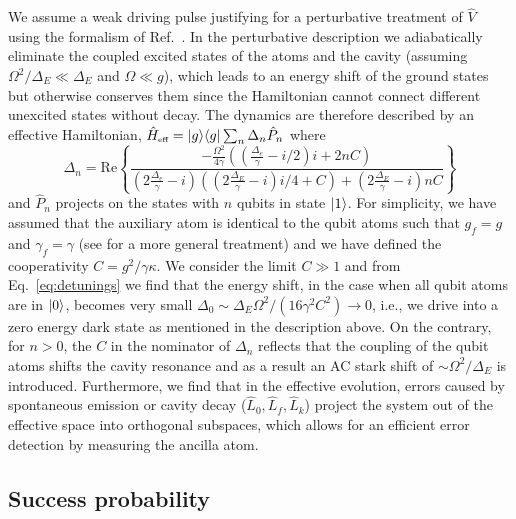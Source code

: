 We assume a weak driving pulse justifying for a perturbative treatment of
$\hat{V}$ using the formalism of Ref.~\cite{Florentin}. In the perturbative
description we adiabatically eliminate the coupled excited states of the atoms
and the cavity (assuming $\Omega^{2}/\Delta_{E}\!\ll\!\Delta_{E}$ and
$\Omega\!\ll\!g$), which leads to an energy shift of the ground states but
otherwise conserves them since the Hamiltonian cannot connect different
unexcited states without decay. The dynamics are therefore described by an
effective Hamiltonian,
$\hat{H}_{\mbox{\tiny eff}}=| g \rangle\langle g |\sum_{n}\Delta_{n}\hat{P}_{n}$ where
\begin{equation}
\Delta_{n}=
\mathrm{Re}\left\{\frac{-\frac{\Omega^{2}}{4\gamma}
((\frac{\Delta_{e}}{\gamma}\!\!-\!\!i/2)i\!\!+\!\!2nC)}
{(2\frac{\Delta_{e}}{\gamma}\!\!-\!\!i)((2\frac{\Delta_{E}}{\gamma}
\!\!-\!\!i)i/4\!\!+\!\!C)\!\!+\!\!(2\frac{\Delta_{E}}{\gamma}\!\!-\!\!i)
nC}\right\}\label{eq:detunings}
\end{equation} 
and $\hat{P}_{n}$ projects on the states with $n$ qubits in state $| 1 \rangle$. For
simplicity, we have assumed that the auxiliary atom is identical to the qubit
atoms such that $g_{f}=g$ and $\gamma_{f}=\gamma$ (see \cite{SM} for a more
general treatment) and we have defined the cooperativity $C=g^{2}/\gamma\kappa$.
We consider the limit $C\gg1$ and from Eq.~\eqref{eq:detunings} we find that the
energy shift, in the case when all qubit atoms are in $| 0 \rangle$, becomes very
small $\Delta_{0}\sim\Delta_{E}\Omega^{2}/(16\gamma^{2} C^{2})\rightarrow 0$,
i.e., we drive into a zero energy dark state as mentioned in the description
above.
On the contrary, for $n>0$, the $C$ in the nominator of $\Delta_{n}$ reflects
that the coupling of the qubit atoms shifts the cavity resonance and as a result
an AC stark shift of $\sim\Omega^{2}/\Delta_{E}$ is introduced.
Furthermore, we find that in the effective evolution, errors caused by
spontaneous emission or cavity decay ($\hat{L}_{0},\hat{L}_{f},\hat{L}_{k}$)
project the system out of the effective space into orthogonal subspaces, which
allows for an efficient error detection by measuring the ancilla atom.

\subsection{Success probability}

